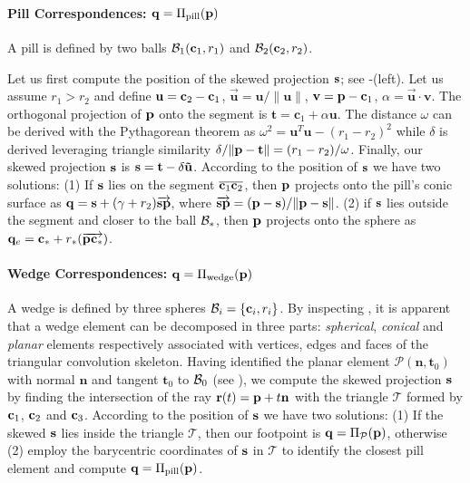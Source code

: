 
\paragraph{Pill Correspondences: $\mathbf{q}=\Pi_\text{pill}(\mathbf{p})$}
A pill is defined by two balls $\mathcal{B}_1(\mathbf{c}_1,r_1)$ and $\mathcal{B}_2(\mathbf{c}_2,r_2)$. 
\begin{DRAFT}
Let us first compute the position of the skewed projection $\mathbf{s}$; see -(left). 
% 
Let us assume $r_1 > r_2$ and define $\mathbf{u} = \mathbf{c}_2-\mathbf{c}_1$, $\mathbf{\vec{u}} = \mathbf{u}/\|\mathbf{u}\|$, $\mathbf{v} = \mathbf{p}-\mathbf{c}_1$, $\alpha=\mathbf{\vec{u}} \cdot \mathbf{v}$. The orthogonal projection of $\mathbf{p}$ onto the segment is $\mathbf{t} = \mathbf{c}_1 + \alpha \mathbf{u}$. The distance $\omega$ can be derived with the Pythagorean theorem as $\omega^2 = \mathbf{u}^T \mathbf{u} - (r_1 - r_2)^2$ while $\delta$ is derived leveraging triangle similarity $\delta / \| \mathbf{p} - \mathbf{t} \| = (r_1-r_2)/\omega$. Finally, our skewed projection $\mathbf{s}$ is $\mathbf{s} = \mathbf{t} - \delta \mathbf{\vec{u}}$.
% 
According to the position of $\mathbf{s}$ we have two solutions: 
(1) If $\mathbf{s}$ lies on the segment $\overline{\mathbf{c}_1 \mathbf{c}_2}$, then $\mathbf{p}$ projects onto the pill's conic surface as $\mathbf{q}=\mathbf{s}+(\gamma+r_2) \overrightarrow{\mathbf{\mathbf{s}} \mathbf{p}}$, where $\overrightarrow{\mathbf{s} \mathbf{p}} = (\mathbf{p}-\mathbf{s})/ \|\mathbf{p}-\mathbf{s}\|$. 
(2) if $\mathbf{s}$ lies outside the segment and closer to the ball $\mathcal{B}_*$, then $\mathbf{p}$ projects onto the sphere as $\mathbf{q}_e = \mathbf{c}_* + r_*(\overrightarrow{\mathbf{p} \mathbf{c}_*})$.
\end{DRAFT}

\paragraph{Wedge Correspondences: $\mathbf{q}=\Pi_\text{wedge}(\mathbf{p})$}
A wedge is defined by three spheres $\mathcal{B}_i = \{\mathbf{c}_i, r_i\}$. By inspecting , it is apparent that a wedge element can be decomposed in three parts: \emph{spherical}, \emph{conical} and \emph{planar} elements respectively associated with vertices, edges and faces of the triangular convolution skeleton. Having identified the planar element $\mathcal{P}(\mathbf{n}, \mathbf{t}_0)$ with normal $\mathbf{n}$ and tangent $\mathbf{t}_0$ to $\mathcal{B}_0$ (see ), we compute the skewed projection $\mathbf{s}$ by finding the intersection of the ray $\mathbf{r}(t) = \mathbf{p} + t\mathbf{n}$ with the triangle $\mathcal{T}$ formed by $\mathbf{c}_1$, $\mathbf{c}_2$ and $\mathbf{c}_3$. 
% 
According to the position of $\mathbf{s}$ we have two solutions:
(1) If the skewed $\mathbf{s}$ lies inside the triangle $\mathcal{T}$, then our footpoint is $\mathbf{q} = \Pi_\mathcal{P}(\mathbf{p})$, otherwise 
(2) employ the barycentric coordinates of $\mathbf{s}$ in $\mathcal{T}$ to identify the closest pill element and compute $\mathbf{q}=\Pi_\text{pill}(\mathbf{p})$.


